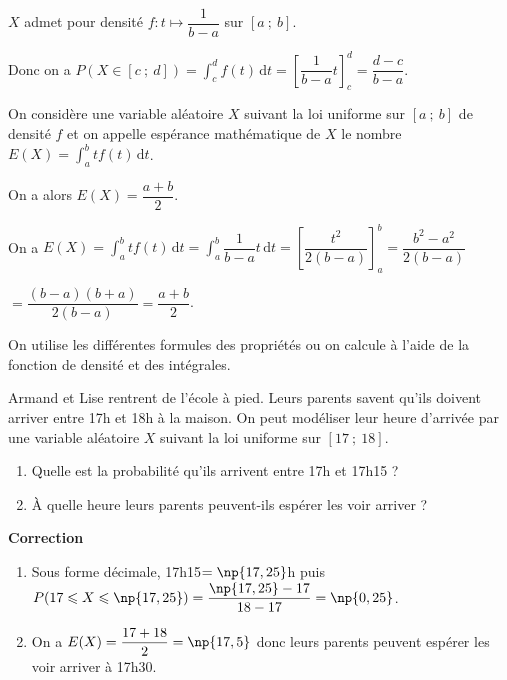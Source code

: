\documentclass{cornouaille}
\begin{document}
\begin{preuve}
$X$ admet pour densité $f:t\mapsto \dfrac{1}{b-a}$ sur $\left[a\ ;\ b \right]$.

Donc on a $P\left(X\in\left[c\ ;\ d \right]\right)=\displaystyle \int_{c}^{d} f(t) \, \textrm{d}t=\left[\dfrac{1}{b-a}t\right]_{c}^{d}=\dfrac{d-c}{b-a}$.
\end{preuve}

\begin{propriete}
On considère une variable aléatoire $X$ suivant la loi uniforme sur $\left[a\ ;\ b \right]$ de densité $f$ et on appelle espérance mathématique de $X$ le nombre $E(X)=\displaystyle \int_{a}^{b} tf(t) \, \textrm{d}t$.

On a alors $E(X)=\dfrac{a+b}{2}$.
\end{propriete}

\begin{preuve}
On a $E(X)=\displaystyle \int_{a}^{b} tf(t) \, \textrm{d}t=\displaystyle \int_{a}^{b} \dfrac{1}{b-a} t \, \textrm{d}t=\left[\dfrac{t^2}{2(b-a)}\right]_a^b=\dfrac{b^2-a^2}{2(b-a)}$

$=\dfrac{(b-a)(b+a)}{2(b-a)}=\dfrac{a+b}{2}$.
\end{preuve}

\begin{methode}
On utilise les différentes formules des propriétés ou on calcule à l'aide de la fonction de densité et des intégrales.

\exercice
Armand et Lise rentrent de l'école à pied. Leurs parents savent qu'ils doivent arriver entre 17h et 18h à la maison. On peut modéliser leur heure d'arrivée par une variable aléatoire $X$ suivant la loi uniforme sur $\left[17\ ;\ 18 \right]$.
\begin{enumerate}
\item Quelle est la probabilité qu'ils arrivent entre 17h et 17h15 ?
\item \`A quelle heure leurs parents peuvent-ils \og{}espérer\fg{} les voir arriver ?
\end{enumerate}

\textbf{Correction}

\begin{enumerate}
\item Sous forme décimale, 17h15$=\np{17,25}$h puis $P(17\leqslant X \leqslant \np{17,25})=\dfrac{\np{17,25}-17}{18-17}=\np{0,25}$.
\item On a $E(X)=\dfrac{17+18}{2}=\np{17,5}$ donc leurs parents peuvent espérer les voir arriver à 17h30.
\end{enumerate}




\end{methode}
\end{document}
